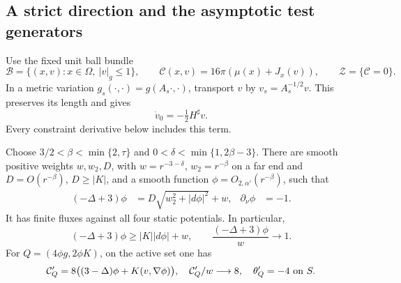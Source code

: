 \subsection{A strict direction and the asymptotic test generators}

Use the fixed unit ball bundle
\[
 \mathcal B=\{(x,v):x\in\Omega,\ |v|_g\leq1\},\qquad
 \mathcal C(x,v)=16\pi(\mu(x)+J_x(v)),
 \qquad \mathcal Z=\{\mathcal C=0\}.
\]
In a metric variation \(g_s(\cdot,\cdot)=g(A_s\cdot,\cdot)\), transport
\(v\) by \(v_s=A_s^{-1/2}v\).  This preserves its length and gives
\begin{equation}
 \dot v_0=-\tfrac12 H^\sharp v.
 \label{eq-vector-transport}
\end{equation}
Every constraint derivative below includes this term.

\begin{lemma}
\label{eq-strict-direction}
Choose \(3/2<\beta<\min\{2,\tau\}\) and
\(0<\delta<\min\{1,2\beta-3\}\).  There are smooth positive weights
\(w,w_2,D\), with \(w=r^{-3-\delta}\), \(w_2=r^{-\beta}\) on a far
end and \(D=O(r^{-\beta})\), \(D\geq |K|\), and a smooth function
\(\phi=O_{2,\alpha'}(r^{-\beta})\), such that
\begin{align}
 (-\Delta+3)\phi
   &=D\sqrt{w_2^2+|d\phi|^2}+w,&
 \partial_\nu\phi&=-1. \label{eq-strict-solve}
\end{align}
It has finite fluxes against all four static potentials.  In
particular,
\[
 (-\Delta+3)\phi\geq |K||d\phi|+w,\qquad
 \frac{(-\Delta+3)\phi}{w}\longrightarrow1.
\]
For \(Q=(4\phi g,2\phi K)\), on the active set one has
\begin{equation}
 \mathcal C'_Q=8\big((3-\Delta)\phi+K(v,\nabla\phi)\big),\quad
 \mathcal C'_Q/w\longrightarrow8,\quad
 \theta'_Q=-4\ \hbox{on }S.
 \label{eq-strict-tests}
\end{equation}
\end{lemma}

